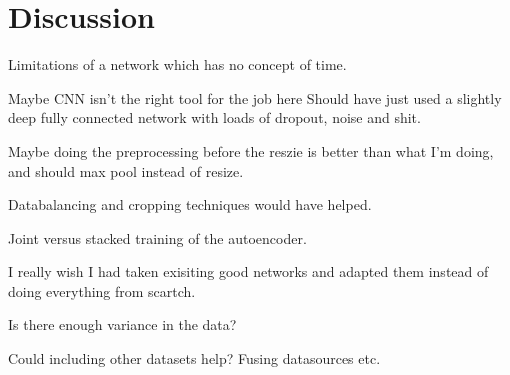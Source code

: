 \chapter{Discussion}
  Limitations of a network which has no concept of time.

  Maybe CNN isn't the right tool for the job here
  Should have just used a slightly deep fully connected network
  with loads of dropout, noise and shit.

  Maybe doing the preprocessing before the reszie is better than what I'm doing,
  and should max pool instead of resize.

  Databalancing and cropping techniques would have helped.

  Joint versus stacked training of the autoencoder.

  I really wish I had taken exisiting good networks and adapted them instead of doing
  everything from scartch.

  Is there enough variance in the data?

  Could including other datasets help? Fusing datasources etc.

